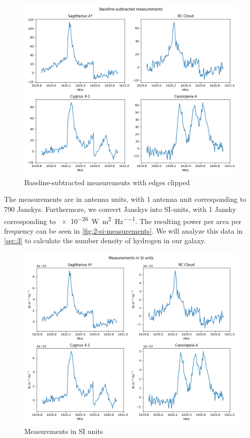 \begin{figure}[H]
    \centering
    \includegraphics[width=1\linewidth]{Doc//Graphics/2-cleaned-measurements.png}
    \caption{Baseline-subtracted measurements with edges clipped}
    \label{fig:2-cleaned-measurements}
\end{figure}

\vspace{1cm}
The measurements are in antenna units, with 1 antenna unit corresponding to 790 Janskys. Furthermore, we convert Janskys into SI-units, with 1 Jansky corresponding to \SI{e-26}{\watt\per\square\meter\per\hertz}. The resulting power per area per frequency can be seen in \autoref{fig:2-si-measurements}. We will analyze this data in \autoref{sec:3} to calculate the number density of hydrogen in our galaxy.

\begin{figure}[H]
    \centering
    \includegraphics[width=1\linewidth]{Doc//Graphics/2-si-measurements.png}
    \caption{Measurements in SI units}
    \label{fig:2-si-measurements}
\end{figure}